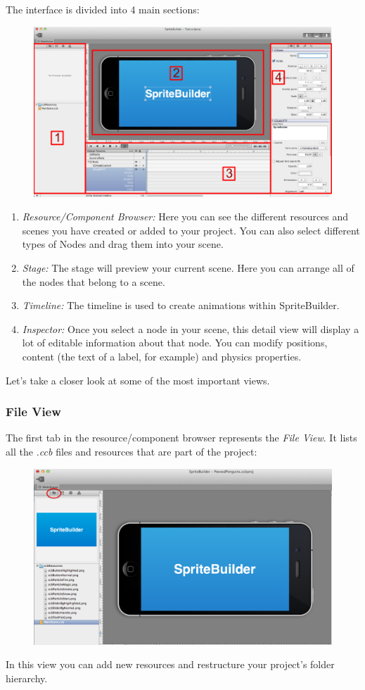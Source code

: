 The \SB{} interface is divided into 4 main sections:
\begin{figure}[H]
		\centering
		\includegraphics[width=0.9\linewidth]{images/spritebuilder/spritebuilder_ui.png}     
\end{figure} 
\begin{enumerate}
  \item \textit{Resource/Component Browser:} Here you can see the different
  resources and scenes you have created or added to your project. You can also select different types of Nodes and drag them into your scene.
  \item \textit{Stage:} The stage will preview your current scene. Here you can
  arrange all of the nodes that belong to a scene. 
  \item \textit{Timeline:} The timeline is used to create animations within
  SpriteBuilder.
  \item \textit{Inspector:} Once you select a node in your scene, this detail
  view will display a lot of editable information about that node. You can modify positions, content (the text of a label, for example) and physics properties.
\end{enumerate}
Let's take a closer look at some of the most important views.

\subsubsection{File View}
The first tab in the resource/component browser represents the \textit{File
View}.
It lists all the \textit{.ccb} files and resources that are part of the \SB{}
project:
\begin{figure}[H]
		\centering
		\includegraphics[width=0.8\linewidth]{images/spritebuilder/spritebuilder_fileview.png}     
\end{figure} 
In this view you can add new resources and restructure your project's folder
hierarchy.
